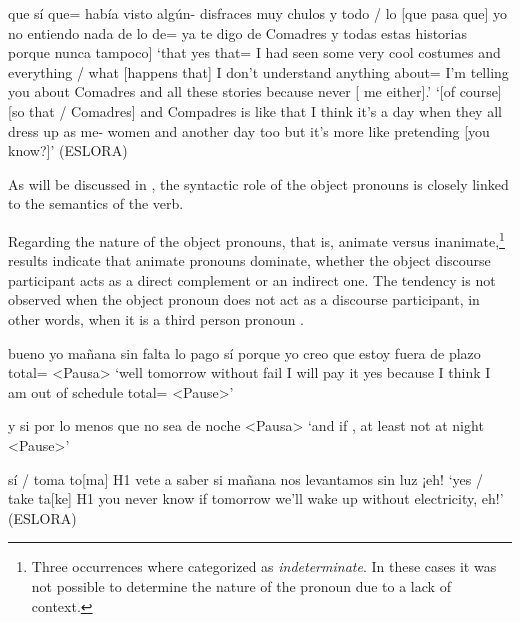 \documentclass[output=paper]{langscibook}
\begin{document}
\ea\label{ex:pierre:8}
\begin{xlist}[Speaker 2]
 que sí que= había visto algún{}- disfraces muy chulos y todo / lo [que pasa que] yo no entiendo nada de lo de= ya te digo de Comadres y todas estas historias porque nunca {\ExHighlight{{me} \ExHighlight{lo} \ExHighlight{[explicaron}}}{ {tampoco]} }
 ‘that yes that= I had seen some very cool costumes and everything / what [happens that] I don’t understand anything about= I’m telling you about Comadres and all these stories because {} {never [}{  } {me either].’}
 ‘[of course] [so that / Comadres] and Compadres is like that I think it’s a day when they all dress up as me- women and another day too but it’s more like pretending [you know?]’  (ESLORA)
\end{xlist}
\z 

As will be discussed in , the syntactic role of the object pronouns is closely linked to the semantics of the verb. 


Regarding the nature of the object pronouns, that is, animate versus inanimate,\footnote{Three occurrences where categorized as \textit{indeterminate}. In these cases it was not possible to determine the nature of the pronoun due to a lack of context.} results indicate that animate pronouns dominate, whether the object discourse participant acts as a direct complement or an indirect one. The tendency is not observed when the object pronoun does not act as a discourse participant, in other words, when it is a third person pronoun . 


\ea\label{ex:pierre:9}
\begin{xlist}[Speaker 2]
 bueno yo mañana sin falta lo pago sí porque yo creo que estoy fuera de plazo total= <Pausa>
 ‘well tomorrow without fail I will pay it yes because I think I am out of schedule total= <Pause>’

 y si  {por lo menos que no sea de noche <Pausa>}
 ‘and if   , at least not at night {<Pause>’}

 sí / toma to[ma] H1 vete a saber si mañana nos levantamos    sin luz ¡eh!
 ‘yes / take ta[ke] H1 you never know if tomorrow we'll wake up without electricity, eh!’ (ESLORA)
\end{xlist}
\z 
\end{document}
